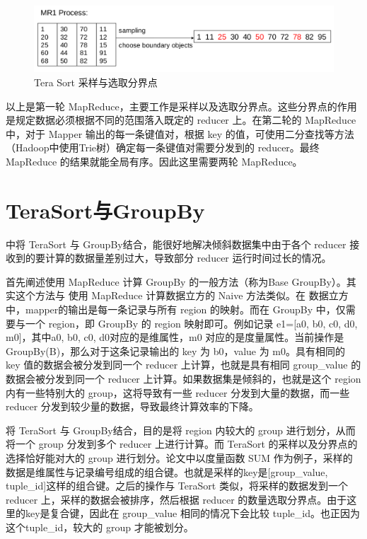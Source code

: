 \begin{figure}[!htb] 
\centering\includegraphics[width=6in]{picture/ch_terasort_mr/tera_sort_mr1} 
\caption{Tera Sort 采样与选取分界点}\label{tera_sort_mr1} 
\end{figure}

以上是第一轮 MapReduce，主要工作是采样以及选取分界点。这些分界点的作用是规定数据必须根据不同的范围落入既定的 reducer 上。在第二轮的 MapReduce 中，对于 Mapper 输出的每一条键值对，根据 key 的值，可使用二分查找等方法（Hadoop中使用Trie树）确定每一条键值对需要分发到的 reducer。最终 MapReduce 的结果就能全局有序。因此这里需要两轮 MapReduce。

\section{TeraSort与GroupBy}

\cite{tao2013minimal} 中将 TeraSort 与 GroupBy结合，能很好地解决倾斜数据集中由于各个 reducer 接收到的要计算的数据量差别过大，导致部分 reducer 运行时间过长的情况。

首先阐述使用 MapReduce 计算 GroupBy 的一般方法（称为Base GroupBy）。其实这个方法与 使用 MapReduce 计算数据立方的 Naive 方法类似。在 数据立方中，mapper的输出是每一条记录与所有 region 的映射。而在 GroupBy 中，仅需要与一个 region，即 GroupBy 的 region 映射即可。例如记录 e1=[a0, b0, c0, d0, m0]，其中a0, b0, c0, d0对应的是维属性，m0 对应的是度量属性。当前操作是 GroupBy(B)，那么对于这条记录输出的 key 为 b0，value 为 m0。具有相同的 key 值的数据会被分发到同一个 reducer 上计算，也就是具有相同 group\_value 的数据会被分发到同一个 reducer 上计算。如果数据集是倾斜的，也就是这个 region 内有一些特别大的 group，这将导致有一些 reducer 分发到大量的数据，而一些 reducer 分发到较少量的数据，导致最终计算效率的下降。

将 TeraSort 与 GroupBy结合，目的是将 region 内较大的 group 进行划分，从而将一个 group 分发到多个 reducer 上进行计算。而 TeraSort 的采样以及分界点的选择恰好能对大的 group 进行划分。论文中以度量函数 SUM 作为例子，采样的数据是维属性与记录编号组成的组合键。也就是采样的key是[group\_value, tuple\_id]这样的组合键。之后的操作与 TeraSort 类似，将采样的数据发到一个 reducer 上，采样的数据会被排序，然后根据 reducer 的数量选取分界点。由于这里的key是复合键，因此在 group\_value 相同的情况下会比较 tuple\_id。也正因为这个tuple\_id，较大的 group 才能被划分。

